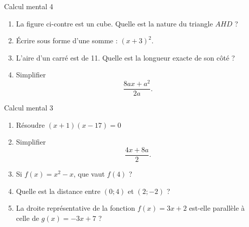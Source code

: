 \documentclass{beamer}
\begin{document}
    

\begin{frame}{Calcul mental 4}

    \begin{enumerate}
        \item

    \pause
            \begin{multicols}{2}

                La figure ci-contre est un cube. Quelle est la nature du triangle \( AHD\) ?

                \columnbreak

                
            \end{multicols}

        \item
    \pause
            Écrire sous forme d'une somme : $(x+3)^2$.
        \item
            \pause
            L'aire d'un carré est de \unit{11}{\centi\meter\squared}. Quelle est la longueur exacte de son côté ?
        \item
            \pause
            Simplifier 
            \begin{equation}
                \frac{ 8ax+a^2 }{ 2a }.
            \end{equation}
            
    \end{enumerate}
\end{frame}


\begin{frame}{Calcul mental 3}
    \pause
    \begin{enumerate}
        \item
            Résoudre \( (x+1)(x-17)=0\)
            \pause
        \item
            Simplifier
            \begin{equation}
                \frac{ 4x+8a }{ 2 }.
            \end{equation}
            \pause
        \item
            Si \( f(x)=x^2-x\), que vaut \( f(4)\) ?
            \pause
        \item
            Quelle est la distance entre \( (0;4)\) et \( (2;-2)\) ?
            \pause
        \item
            La droite représentative de la fonction \( f(x)=3x+2\) est-elle parallèle à celle de \( g(x)=-3x+7\) ?
    \end{enumerate}
\end{frame}
\end{document}
